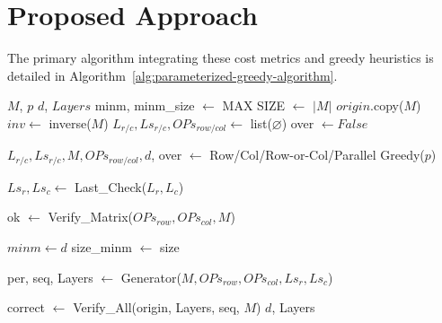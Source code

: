 \section{Proposed Approach}

The primary algorithm integrating these cost metrics and greedy heuristics is detailed in Algorithm~\ref{alg:parameterized-greedy-algorithm}.

\begin{algorithm}[htbp]
\caption{Parameterized Greedy Algorithm}
\label{alg:parameterized-greedy-algorithm}
\footnotesize
\begin{algorithmic}[1]
\Require $M$, $p$
\Ensure $d$, $Layers$
\State minm, minm\_size $\leftarrow$ MAX
\State SIZE $\leftarrow$ $|M|$
\State $origin$.copy($M$)
\State $inv \leftarrow$ inverse($M$)
\State $L_{r/c}, Ls_{r/c}, OPs_{row/col} \leftarrow$ list($\varnothing$)
\State over $\leftarrow False$

\State $L_{r/c}, Ls_{r/c}, M, OPs_{row/col}, d$, over $\leftarrow$ Row/Col/Row-or-Col/Parallel Greedy($p$)

	\State \Return
\EndIf

\State $Ls_{r}, Ls_{c} \leftarrow$ Last\_Check($L_{r}, L_{c}$)

\State ok $\leftarrow$ Verify\_Matrix($OPs_{row}, OPs_{col}, M$)

	\State \Return
\EndIf

\State $minm \leftarrow d$
\State size\_minm $\leftarrow$ size

\State per, seq, Layers $\leftarrow$ Generator($M, OPs_{row}, OPs_{col}, Ls_{r}, Ls_{c}$)

\State correct $\leftarrow$ Verify\_All(origin, Layers, seq, $M$)
	\State \Return
\EndIf
\State \Return $d$, Layers
\end{algorithmic}
\end{algorithm}